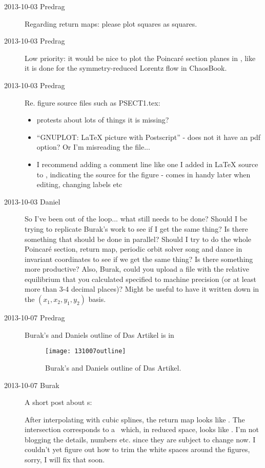 \begin{description}
\item[2013-10-03 Predrag] Regarding return maps: please plot squares as squares.

\item[2013-10-03 Predrag] Low priority: it would be nice to plot the
Poincar\'e section planes in , like it is
done for the symmetry-reduced Lorentz flow in ChaosBook.

\item[2013-10-03 Predrag] Re. figure source files  such as PSECT1.tex:
\begin{itemize}
  \item protests about lots of things it is missing?
  \item ``GNUPLOT: LaTeX picture with Postscript'' - does not it have an pdf option?
  Or I'm misreading the file...
  \item I recommend adding a comment line like one I added in LaTeX source
    to , indicating the source for the figure -
    comes in handy later when editing, changing labels etc
\end{itemize}

\item[2013-10-03 Daniel] So I've been out of the loop... what still needs to be done?
Should I be trying to replicate Burak's work to see if I get the same thing? Is there
something that should be done in parallel? Should I try to do the whole Poincar\'e section,
return map, periodic orbit solver song and dance in invariant coordinates to see if we
get the same thing? Is there something more productive? Also, Burak, could you upload a file
with the relative equilibrium that you calculated specified to machine precision
(or at least more than 3-4 decimal places)? Might be useful to have it written down
in the $(x_1,x_2,y_1,y_2)$ basis.

\item[2013-10-07 Predrag] Burak's and Daniels outline of Das Artikel is
in 

\begin{figure}
  \centering
  \texttt{[image: 131007outline]}
  \caption{
Burak's and Daniels outline of Das Artikel.
  }\label{fig:131007outline}
\end{figure}


\item[2013-10-07 Burak] A short post about \rpo s:

After interpolating with cubic splines, the return map 
looks like . The intersection corresponds to a
\rpo\ which, in reduced space, looks like . I'm not blogging
the details, numbers etc. since they are subject to change now. I couldn't
yet figure out how to trim the white spaces around the figures, sorry, I will
fix that soon.


\end{description}
